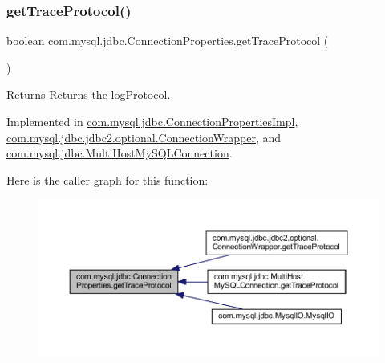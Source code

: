 \subsubsection{\texorpdfstring{get\+Trace\+Protocol()}{getTraceProtocol()}}
{\footnotesize\ttfamily boolean com.\+mysql.\+jdbc.\+Connection\+Properties.\+get\+Trace\+Protocol (\begin{DoxyParamCaption}{ }\end{DoxyParamCaption})}

\begin{DoxyReturn}{Returns}
Returns the log\+Protocol. 
\end{DoxyReturn}


Implemented in \mbox{\hyperlink{classcom_1_1mysql_1_1jdbc_1_1_connection_properties_impl_a22dbcbcac64b1425e6eae93481f4f9b7}{com.\+mysql.\+jdbc.\+Connection\+Properties\+Impl}}, \mbox{\hyperlink{classcom_1_1mysql_1_1jdbc_1_1jdbc2_1_1optional_1_1_connection_wrapper_a06d5bb90a0cf97abeb4975e63d92ea7a}{com.\+mysql.\+jdbc.\+jdbc2.\+optional.\+Connection\+Wrapper}}, and \mbox{\hyperlink{classcom_1_1mysql_1_1jdbc_1_1_multi_host_my_s_q_l_connection_ac04f24be8ad62148eb1ea1718ea42851}{com.\+mysql.\+jdbc.\+Multi\+Host\+My\+S\+Q\+L\+Connection}}.

Here is the caller graph for this function\+:\nopagebreak
\begin{figure}[H]
\begin{center}
\leavevmode
\includegraphics[width=350pt]{interfacecom_1_1mysql_1_1jdbc_1_1_connection_properties_ac91e629cc7505335e1de76be5d070102_icgraph}
\end{center}
\end{figure}
\mbox{\label{interfacecom_1_1mysql_1_1jdbc_1_1_connection_properties_af48fc4f6629e4ada4cf9bc8668207e1c}} 
